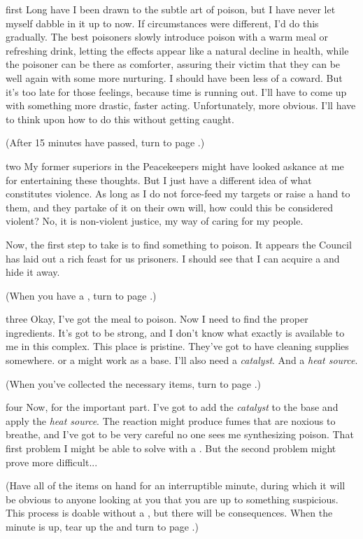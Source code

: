 \documentclass[notebook]{Silversiders} %
\begin{document}
\startnotebook{\nPoison{}}

\begin{page}{first}
Long have I been drawn to the subtle art of poison, but I have never let myself dabble in it up to now. If circumstances were different, I'd do this gradually. The best poisoners slowly introduce poison with a warm meal or refreshing drink, letting the effects appear like a natural decline in health, while the poisoner can be there as comforter, assuring their victim that they can be well again with some more nurturing. I should have been less of a coward. But it's too late for those feelings, because time is running out. I'll have to come up with something more drastic, faster acting. Unfortunately, more obvious. I'll have to think upon how to do this without getting caught.

(After 15 minutes have passed, turn to page .)
\end{page}

\begin{page}{two}
My former superiors in the Peacekeepers might have looked askance at me for entertaining these thoughts. But I just have a different idea of what constitutes violence. As long as I do not force-feed my targets or raise a hand to them, and they partake of it on their own will, how could this be considered violent? No, it is non-violent justice, my way of caring for my people.

Now, the first step to take is to find something to poison. It appears the Council has laid out a rich feast for us prisoners. I should see that I can acquire a \iVealDinner{} and hide it away.

(When you have a \iVealDinner{}, turn to page .)
\end{page}

\begin{page}{three}
Okay, I've got the meal to poison. Now I need to find the proper ingredients. It's got to be strong, and I don't know what exactly is available to me in this complex. This place is pristine. They've got to have cleaning supplies somewhere. \iCleaningFluid{} or a \iPolish{} might work as a base. I'll also need a \emph{catalyst}. And a \emph{heat source}.

(When you've collected the necessary items, turn to page .)
\end{page}

\begin{page}{four}
Now, for the important part. I've got to add the \emph{catalyst} to the base and apply the \emph{heat source}. The reaction might produce fumes that are noxious to breathe, and I've got to be very careful no one sees me synthesizing poison. That first problem I might be able to solve with a \iFaceMask{}. But the second problem might prove more difficult...

(Have all of the items on hand for an interruptible minute, during which it will be obvious to anyone looking at you that you are up to something suspicious. This process is doable without a \iFaceMask{}, but there will be consequences. When the minute is up, tear up the \iVealDinner{} and turn to page .)
\end{page}
\end{document}
